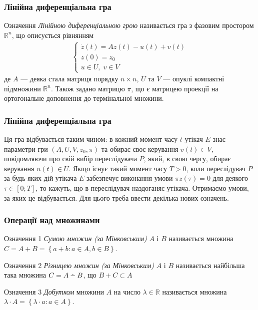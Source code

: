 \documentclass[10pt,pdf]{beamer}
\newcommand{\R}{\mathbb{R}}
\renewcommand{\d}[1]{\dot{#1}}
\renewcommand{\l}{\left}
\renewcommand{\r}{\right}
\def\setdif{\mathbin{\ooalign{\hss\raise1ex\hbox{.}\hss\cr
  \mathsurround=0pt$-$}}}
\begin{document}
    \begin{frame}
        \frametitle{Лінійна диференціальна гра}
    
        \begin{block}{Означення}
            \emph{Лінійною диференціальною грою} називається гра з фазовим простором
            $\R^n$, що описується рівнянням
            \begin{gather*}
                \begin{cases}
                    \d{z}(t) = A z(t) - u(t) + v(t) \\
                    z(0) = z_0 \\
                    u \in U, \; v \in V
                \end{cases}
            \end{gather*}
            де $A$ --- деяка стала матриця порядку $n\times n$, $U$ та $V$ --- опуклі компактні
            підмножини $\R^n$. Також задано матрицю $\pi$, що є матрицею проекції на ортогональне доповнення до термінальної множини.
        \end{block}
    \end{frame}
    \begin{frame}
        \frametitle{Лінійна диференціальна гра}
    
        Ця гра відбувається таким чином: в кожний момент часу $t$ утікач $E$ знає параметри гри
        $\l(A, U, V, z_0, \pi \r)$ та обирає своє керування $v(t) \in V$, повідомляючи про свій вибір
        переслідувача $P$, який, в свою чергу, обирає керування $u(t) \in U$.
        Якщо існує такий момент часу $T > 0$, коли переслідувач $P$ за будь-яких дій
        утікача $E$ забезпечує виконання умови $\pi z(\tau) = 0$ для деякого
        $\tau \in [0; T]$, то кажуть, що в переслідувач наздоганяє утікача.
        Отримаємо умови, за яких це відбувається. Для цього треба ввести декілька нових означень.
    
    \end{frame}
    \begin{frame}
        \frametitle{Операції над множинами}
    
        \begin{block}{Означення 1}
            \emph{Сумою множин (за Мінковським)} $A$ і $B$ називається множина
            $C = A + B = \l\{ a + b : a \in A, b \in B\r\}$.
        \end{block}

        \begin{block}{Означення 2}
            \emph{Різницею множин (за Мінковським)} $A$ і $B$ називається найбільша така множина
            $C = A \setdif B$, що $B + C \subset A$
        \end{block}

        \begin{block}{Означення 3}
            \emph{Добутком} множини $A$ на число $\lambda \in \R$ називається множина
            $\lambda \cdot A = \l\{\lambda \cdot a : a \in A \r\}$.
        \end{block}
    \end{frame}
\end{document}
